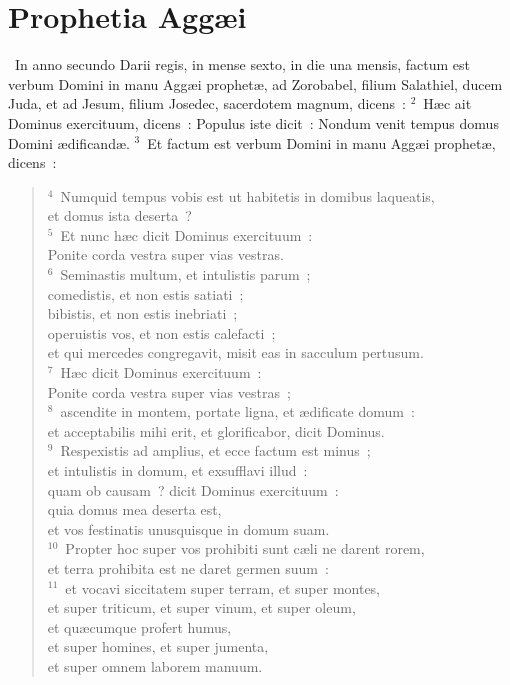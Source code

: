 {\centering \section*{Prophetia Aggæi}}\thispagestyle{empty}

~In anno secundo Darii regis, in mense sexto, in die una mensis, factum est verbum Domini in manu Agg\ae i prophet\ae , ad Zorobabel, filium Salathiel, ducem Juda, et ad Jesum, filium Josedec, sacerdotem magnum, dicens~:
${}^{2}$~H\ae c ait Dominus exercituum, dicens~: Populus iste dicit~: Nondum venit tempus domus Domini \ae dificand\ae .
${}^{3}$~Et factum est verbum Domini in manu Agg\ae i prophet\ae , dicens~:
\begin{flushleft}\begin{verse}${}^{4}$~Numquid tempus vobis est ut habitetis in domibus laqueatis,\\ et domus ista deserta~?\\
${}^{5}$~Et nunc h\ae c dicit Dominus exercituum~:\\ Ponite corda vestra super vias vestras.\\
${}^{6}$~Seminastis multum, et intulistis parum~;\\ comedistis, et non estis satiati~;\\ bibistis, et non estis inebriati~;\\ operuistis vos, et non estis calefacti~;\\ et qui mercedes congregavit, misit eas in sacculum pertusum.\\
${}^{7}$~H\ae c dicit Dominus exercituum~:\\ Ponite corda vestra super vias vestras~;\\
${}^{8}$~ascendite in montem, portate ligna, et \ae dificate domum~:\\ et acceptabilis mihi erit, et glorificabor, dicit Dominus.\\
${}^{9}$~Respexistis ad amplius, et ecce factum est minus~;\\ et intulistis in domum, et exsufflavi illud~:\\ quam ob causam~? dicit Dominus exercituum~:\\ quia domus mea deserta est,\\ et vos festinatis unusquisque in domum suam.\\
${}^{10}$~Propter hoc super vos prohibiti sunt c\ae li ne darent rorem,\\ et terra prohibita est ne daret germen suum~:\\
${}^{11}$~et vocavi siccitatem super terram, et super montes,\\ et super triticum, et super vinum, et super oleum,\\ et qu\ae cumque profert humus,\\ et super homines, et super jumenta,\\ et super omnem laborem manuum.\end{verse}\end{flushleft}


